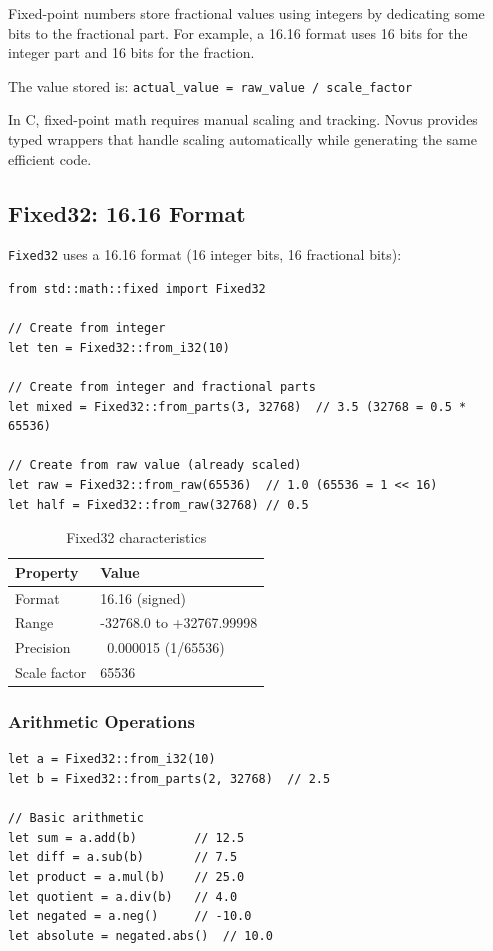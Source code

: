 Fixed-point numbers store fractional values using integers by dedicating some bits to the fractional part. For example, a 16.16 format uses 16 bits for the integer part and 16 bits for the fraction.

The value stored is: \texttt{actual\_value = raw\_value / scale\_factor}

\begin{comingfromc}
In C, fixed-point math requires manual scaling and tracking. Novus provides typed wrappers that handle scaling automatically while generating the same efficient code.
\end{comingfromc}

\subsection{Fixed32: 16.16 Format}

\texttt{Fixed32} uses a 16.16 format (16 integer bits, 16 fractional bits):

\begin{lstlisting}
from std::math::fixed import Fixed32

// Create from integer
let ten = Fixed32::from_i32(10)

// Create from integer and fractional parts
let mixed = Fixed32::from_parts(3, 32768)  // 3.5 (32768 = 0.5 * 65536)

// Create from raw value (already scaled)
let raw = Fixed32::from_raw(65536)  // 1.0 (65536 = 1 << 16)
let half = Fixed32::from_raw(32768) // 0.5
\end{lstlisting}

\begin{table}[h]
\centering
\begin{tabular}{ll}
\textbf{Property} & \textbf{Value} \\
\hline
Format & 16.16 (signed) \\
Range & -32768.0 to +32767.99998 \\
Precision & ~0.000015 (1/65536) \\
Scale factor & 65536 \\
\end{tabular}
\caption{Fixed32 characteristics}
\end{table}

\subsubsection{Arithmetic Operations}

\begin{lstlisting}
let a = Fixed32::from_i32(10)
let b = Fixed32::from_parts(2, 32768)  // 2.5

// Basic arithmetic
let sum = a.add(b)        // 12.5
let diff = a.sub(b)       // 7.5
let product = a.mul(b)    // 25.0
let quotient = a.div(b)   // 4.0
let negated = a.neg()     // -10.0
let absolute = negated.abs()  // 10.0
\end{lstlisting}

